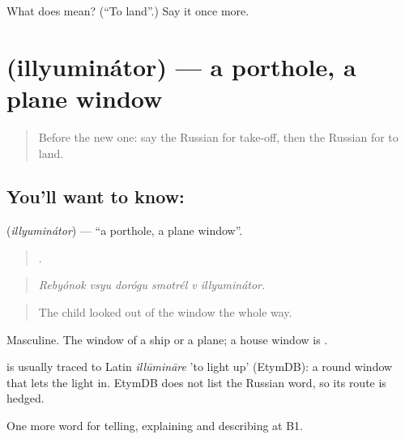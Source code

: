 \begin{tcolorbox}[breakable,colback=teal!4,colframe=teal!35!black,title={Before you move on}]
What does  mean? (\textquotedblleft{}To land\textquotedblright{}.) Say it once more.
\end{tcolorbox}
\section[\texorpdfstring{\ru{иллюминатор} (illyuminátor)}{иллюминатор (illyuminátor)}]{ (illyuminátor) — a porthole, a plane window}

\label{lesson:RU-C421-illyuminator}



\begin{quote}
Before the new one: say the Russian for take-off, then the Russian for to land.
\end{quote}

\subsection*{You'll want to know: }
\textbf{} (\emph{illyuminátor}) — \textquotedblleft{}a porthole, a plane window\textquotedblright{}.

\begin{quote}
     .
\end{quote}

\begin{quote}
\emph{Rebyónok vsyu dorógu smotrél v illyuminátor.}
\end{quote}

\begin{quote}
The child looked out of the window the whole way.
\end{quote}

Masculine. The window of a ship or a plane; a house window is \emph{}.

\begin{cousinweb}
\emph{} is usually traced to Latin \emph{illūmināre} 'to light up' (EtymDB): a round window that lets the light in. EtymDB does not list the Russian word, so its route is hedged.
\end{cousinweb}

\begin{grammarlens}[title={What you've built}]
One more word for telling, explaining and describing at B1.
\end{grammarlens}

